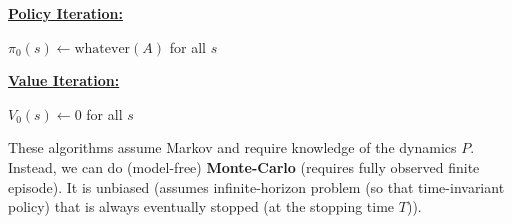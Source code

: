 \documentclass[10pt,landscape]{article}
\DeclareMathOperator*{\argmax}{argmax}
\begin{document}
\begin{multicols}{3}

\underline{\textbf{Policy Iteration:}}
\begin{algorithm}[H]
  $\pi_0(s) \gets \textrm{whatever}(A)$ for all $s$  \\
\end{algorithm}


\underline{\textbf{Value Iteration:}}
\begin{algorithm}[H]
  $V_0(s) \gets 0$ for all $s$ 
  \\
\end{algorithm}
\vspace{-1mm}
These algorithms assume Markov and require knowledge of the dynamics $P$. Instead, we can do (model-free) \textbf{Monte-Carlo} (requires fully observed finite episode). It is unbiased (assumes infinite-horizon problem (so that time-invariant policy) that is always eventually stopped (at the stopping time $T$)). 






\end{multicols}
\end{document}
